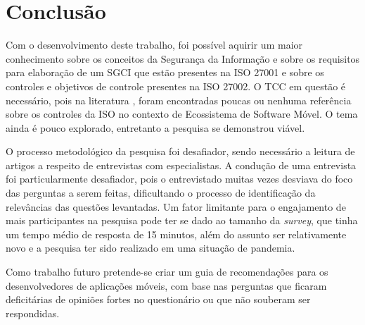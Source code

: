  \chapter{\label{chap:intro}Conclusão}
 



Com o desenvolvimento deste trabalho, foi possível aquirir um maior conhecimento sobre os conceitos da Segurança da Informação e sobre os requisitos para elaboração de um SGCI que estão presentes na ISO 27001 e sobre os controles e objetivos de controle presentes na ISO 27002.  O TCC em questão é necessário, pois na literatura  \cite{caio2019}, foram encontradas poucas ou nenhuma referência sobre os controles da ISO no contexto de Ecossistema de Software Móvel. O tema ainda é pouco explorado, entretanto a pesquisa se demonstrou viável.
 
O processo metodológico da pesquisa foi desafiador, sendo necessário a leitura de artigos a respeito de entrevistas com especialistas. A condução de uma entrevista foi particularmente desafiador, pois o entrevistado muitas vezes desviava do foco das perguntas a serem feitas, dificultando o processo de identificação da relevâncias das questões levantadas. Um fator limitante para o engajamento de mais participantes na pesquisa pode ter se dado ao tamanho da \textit{survey}, que tinha um tempo médio de resposta de 15 minutos, além do assunto ser relativamente novo e a pesquisa ter sido realizado em uma situação de pandemia.
 
 
 Como trabalho futuro pretende-se criar um guia de recomendações para os desenvolvedores de aplicações móveis, com base nas perguntas que ficaram deficitárias de opiniões fortes no questionário ou que não souberam ser respondidas.
 
 

 
 
